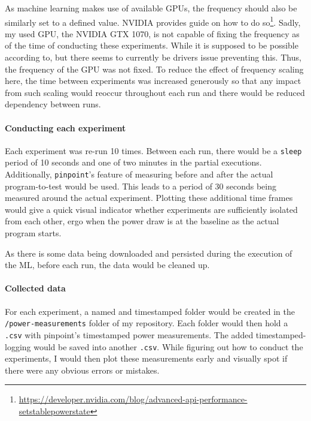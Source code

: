 As machine learning makes use of available GPUs, the frequency should also be similarly set to a defined value. 
NVIDIA provides guide on how to do so\footnote{\url{https://developer.nvidia.com/blog/advanced-api-performance-setstablepowerstate}}.
Sadly, my used GPU, the NVIDIA GTX 1070, is not capable of fixing the frequency as of the time of conducting these experiments. 
While it is supposed to be possible according to, but there seems to currently be drivers issue preventing this. 
Thus, the frequency of the GPU was not fixed. 
To reduce the effect of frequency scaling here, the time between experiments was increased generously so that any impact from such scaling would reoccur throughout each run and there would be reduced dependency between runs.


\paragraph{Conducting each experiment}

Each experiment was re-run 10 times. Between each run, there would be a \verb|sleep| period of 10 seconds and one of two minutes in the partial executions. 
Additionally, \verb|pinpoint|'s feature of measuring before and after the actual program-to-test would be used. 
This leads to a period of 30 seconds being measured around the actual experiment. 
Plotting these additional time frames would give a quick visual indicator whether experiments are sufficiently isolated from each other, ergo when the power draw is at the baseline as the actual program starts.

As there is some data being downloaded and persisted during the execution of the ML, before each run, the data would be cleaned up.

\paragraph{Collected data}

For each experiment, a named and timestamped folder would be created in the \verb|/power-measurements| folder of my repository. Each folder would then hold a \verb|.csv| with pinpoint's timestamped power measurements. 
The added timestamped-logging would be saved into another \verb|.csv|. 
While figuring out how to conduct the experiments, I would then plot these measurements early and visually spot if there were any obvious errors or mistakes.

